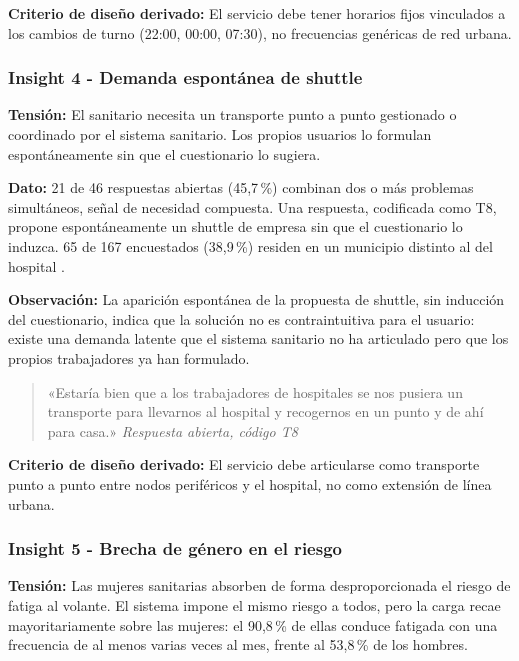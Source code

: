\textbf{Criterio de diseño derivado:} El servicio debe tener
horarios fijos vinculados a los cambios de turno (22:00, 00:00,
07:30), no frecuencias genéricas de red urbana.


\subsubsection{Insight 4 - Demanda espontánea de shuttle}
\label{sec:insight-4}

\textbf{Tensión:} El sanitario necesita un transporte
punto a punto gestionado o coordinado por el sistema sanitario.
Los propios usuarios lo formulan espontáneamente sin que el
cuestionario lo sugiera.

\textbf{Dato:} 21 de 46 respuestas abiertas (45{,}7\,\%)
combinan dos o más problemas simultáneos, señal de necesidad
compuesta. Una respuesta, codificada como T8, propone
espontáneamente un shuttle de empresa sin que el cuestionario
lo induzca. 65 de 167 encuestados (38{,}9\,\%) residen en
un municipio distinto al del hospital \parencite{LouridoRegueira2026}.

\textbf{Observación:} La aparición espontánea de la propuesta de shuttle, sin inducción del cuestionario, indica que la solución no es contraintuitiva para el usuario: existe una demanda latente que el sistema sanitario no ha articulado pero que los propios trabajadores ya han formulado.

\begin{quote}
«Estaría bien que a los trabajadores de hospitales se nos
pusiera un transporte para llevarnos al hospital y recogernos
en un punto y de ahí para casa.»
\hfill\textit{Respuesta abierta, código T8 \parencite{LouridoRegueira2026}}
\end{quote}

\textbf{Criterio de diseño derivado:} El servicio debe
articularse como transporte punto a punto entre nodos
periféricos y el hospital, no como extensión de línea urbana.


\subsubsection{Insight 5 - Brecha de género en el riesgo}
\label{sec:insight-5}

\textbf{Tensión:} Las mujeres sanitarias absorben de forma
desproporcionada el riesgo de fatiga al volante. El sistema
impone el mismo riesgo a todos, pero la carga recae
mayoritariamente sobre las mujeres: el 90{,}8\,\% de ellas
conduce fatigada con una frecuencia de al menos varias veces
al mes, frente al 53{,}8\,\% de los hombres.


